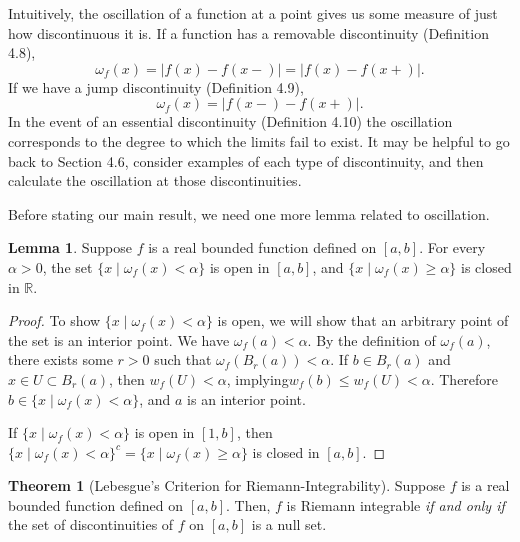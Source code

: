\documentclass{article}
\newcommand{\R}{\mathbb{R}}
\newcommand{\abs}[1]{\left\lvert#1\right\rvert}
\theoremstyle{definition}
\newtheorem{theorem}{Theorem}[section]
\newtheorem{lemma}{Lemma}[section]
\begin{document}
	Intuitively, the oscillation of a function at a point gives us some measure of just how discontinuous it is. If a function has a removable discontinuity (Definition 4.8), $$  \omega_f(x) =\abs{f(x)-f(x-)} = \abs{f(x)-f(x+)}.$$ If we have a jump discontinuity (Definition 4.9), $$\omega_f(x)=\abs{f(x-)-f(x+)}.$$  In the event of an essential discontinuity (Definition 4.10) the oscillation corresponds to the degree to which the limits fail to exist. It may be helpful to go back to Section 4.6, consider examples of each type of discontinuity, and then calculate the oscillation at those discontinuities. 
	
	Before stating our main result, we need one more lemma related to oscillation. 
	\begin{lemma}
		Suppose $ f $ is a real bounded function defined on $ [a,b] $. For every $ \alpha > 0 $, the set $ \{x\mid\omega_f(x)<\alpha\} $ is open in $ [a,b] $, and $ \{x\mid\omega_f(x)\ge\alpha\} $ is closed in $ \R $.
	\end{lemma}
	\begin{proof}
		To show $ \{x\mid\omega_f(x)<\alpha\} $ is open, we will show that an arbitrary point of the set is an interior point. We have $ \omega_f(a)<\alpha $. By the definition of $ \omega_f(a) $, there exists some $ r>0 $ such that $ \omega_f(B_r(a))<\alpha $. If $ b\in B_r(a) $ and $ x\in U\subset B_r(a) $, then $ w_f(U)<\alpha $, implying$ w_f(b)\le w_f(U)<\alpha$.  Therefore $ b\in \{x\mid\omega_f(x)<\alpha\} $, and $ a $ is an interior point. 
		
		If   $ \{x\mid\omega_f(x)<\alpha\} $  is open in $ [1,b] $, then $ \{x\mid\omega_f(x)<\alpha\} ^c=\{x\mid\omega_f(x)\ge\alpha\}  $ is closed in $ [a,b] $.  
	\end{proof}
	\begin{theorem}[Lebesgue's Criterion for Riemann-Integrability]
		Suppose $ f $ is a real bounded function defined on $ [a,b] $. Then, $ f $ is Riemann integrable \textit{if and only if} the set of discontinuities of $ f $ on $ [a,b] $ is a null set.
	\end{theorem}
\end{document}
